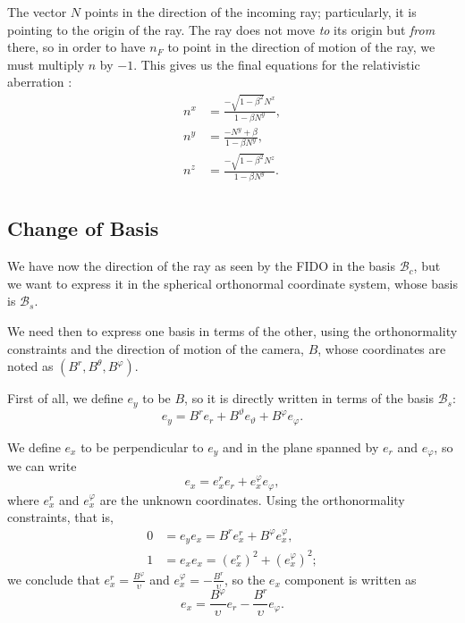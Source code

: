 The vector $N$ points in the direction of the incoming ray; particularly, it is pointing to the origin of the ray. The ray does not move \emph{to} its origin but \emph{from} there, so in order to have $n_F$ to point in the direction of motion of the ray, we must multiply $n$ by $-1$. This gives us the final equations for the relativistic aberration \cite[Eq. (A.9)]{thorne15}:
\begin{align}
	n^x &= \frac{-\sqrt{1 - \beta^2}N^x}{1 - \beta N^y}, \\
	n^y &= \frac{- N^y + \beta}{1 - \beta N^y}, \\
	n^z &= \frac{-\sqrt{1 - \beta^2} N^z}{1 - \beta N^y}. \\
\end{align}

\subsection{Change of Basis}

We have now the direction of the ray as seen by the \ac{FIDO} in the basis $\mathcal{B}_c$, but we want to express it in the spherical orthonormal coordinate system, whose basis is $\mathcal{B}_s$.

We need then to express one basis in terms of the other, using the orthonormality constraints and the direction of motion of the camera, $B$, whose coordinates are noted as $(B^r, B^\theta, B^\varphi)$.

First of all, we define $e_y$ to be $B$, so it is directly written in terms of the basis $\mathcal{B}_s$:
\begin{equation}
	\label{eq:changey}
	e_y = B^r e_r + B^\vartheta e_\vartheta + B^\varphi e_\varphi.
\end{equation}

We define $e_x$ to be perpendicular to $e_y$ and in the plane spanned by $e_r$ and $e_\varphi$, so we can write
\begin{equation*}
	e_x = e_x^r e_r + e_x^\varphi e_\varphi,
\end{equation*}
where $e_x^r$ and $e_x^\varphi$ are the unknown coordinates. Using the orthonormality constraints, that is,
\begin{align*}
	0 &= e_y e_x = B^r e_x^r + B^\varphi e_x^\varphi, \\
	1 &= e_x e_x = \left( e_x^r \right)^2 + \left(e_x^\varphi\right)^2;
\end{align*}
we conclude that $e_x^r = \frac{B^\varphi}{\upsilon}$ and  $e_x^\varphi = -\frac{B^r}{\upsilon}$, so the $e_x$ component is written as
\begin{equation}
	\label{eq:changex}
	e_x = \frac{B^\varphi}{\upsilon} e_r - \frac{B^r}{\upsilon} e_\varphi.
\end{equation}

